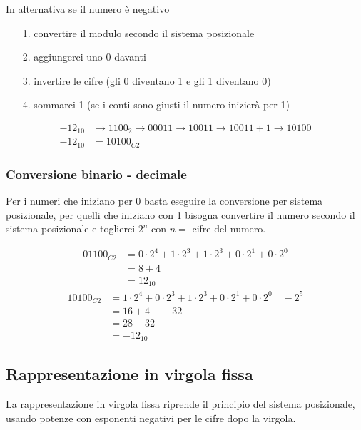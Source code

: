 \documentclass[a4paper]{article}
\begin{document}
In alternativa se il numero è negativo
\begin{itemize}[topsep=3pt, itemsep=0pt]
	\item[1.] convertire il modulo secondo il sistema posizionale
	\item[2.] aggiungerci uno 0 davanti
	\item[3.] invertire le cifre (gli 0 diventano 1 e gli 1 diventano 0)
	\item[4.] sommarci 1 (se i conti sono giusti il numero inizierà per 1)
\end{itemize}
\begin{align*}
	-12_{10} &\rightarrow 1100_{2} \rightarrow 00011 \rightarrow 10011 \rightarrow 10011 + 1 \rightarrow 10100 \\
	-12_{10} &= 10100_{C2}
\end{align*}

\subsubsection*{Conversione binario - decimale}
Per i numeri che iniziano per 0 basta eseguire la conversione per sistema posizionale, per quelli che iniziano con
1 bisogna convertire il numero secondo il sistema posizionale e toglierci \(2^n\) con \(n =\) cifre del numero.

\begin{align*}
	01100_{C2} &= 0 \cdot 2 ^ 4 + 1 \cdot 2 ^ 3 + 1 \cdot 2 ^ 3 + 0 \cdot 2 ^ 1 + 0 \cdot 2 ^ 0 \\
	&= 8 + 4 \\
	&= 12_{10}
\end{align*}
\begin{align*}
	10100_{C2} &= 1 \cdot 2 ^ 4 +  0 \cdot 2 ^ 3 + 1 \cdot 2 ^ 3 + 0 \cdot 2 ^ 1 + 0 \cdot 2 ^ 0 \quad - 2 ^ 5\\
	&= 16 + 4 \quad - 32 \\
	&= 28 - 32 \\
	&= -12_{10}
\end{align*}

\newpage

\subsection{Rappresentazione in virgola fissa}
La rappresentazione in virgola fissa riprende il principio del sistema posizionale, usando potenze con esponenti negativi
per le cifre dopo la virgola.
\end{document}
